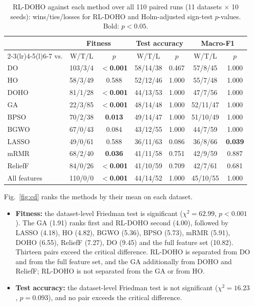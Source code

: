 \documentclass[journal]{IEEEtran}
\begin{document}
\begin{table}[t]
\centering
\caption{RL-DOHO against each method over all 110 paired runs (11 datasets $\times$ 10 seeds): wins/ties/losses for RL-DOHO and Holm-adjusted sign-test $p$-values. Bold: $p<0.05$.}
\label{tab:pooled}
\footnotesize
\setlength{\tabcolsep}{2.6pt}
\begin{tabular}{@{}lcccccc@{}}
\toprule
& \multicolumn{2}{c}{Fitness} & \multicolumn{2}{c}{Test accuracy} & \multicolumn{2}{c}{Macro-F1} \\
\cmidrule(lr){2-3}\cmidrule(lr){4-5}\cmidrule(l){6-7}
vs. & W/T/L & $p$ & W/T/L & $p$ & W/T/L & $p$ \\
\midrule
DO & 103/3/4 & \textbf{$<$0.001} & 58/14/38 & 0.467 & 57/8/45 & 1.000 \\
HO & 58/3/49 & 0.588 & 52/12/46 & 1.000 & 55/7/48 & 1.000 \\
DOHO & 81/1/28 & \textbf{$<$0.001} & 44/13/53 & 1.000 & 47/7/56 & 1.000 \\
\midrule
GA & 22/3/85 & \textbf{$<$0.001} & 48/14/48 & 1.000 & 52/11/47 & 1.000 \\
BPSO & 70/2/38 & \textbf{0.013} & 49/14/47 & 1.000 & 51/10/49 & 1.000 \\
BGWO & 67/0/43 & 0.084 & 43/12/55 & 1.000 & 44/7/59 & 1.000 \\
\midrule
LASSO & 49/0/61 & 0.588 & 36/11/63 & 0.086 & 36/8/66 & \textbf{0.039} \\
mRMR & 68/2/40 & \textbf{0.036} & 41/11/58 & 0.751 & 42/9/59 & 0.887 \\
ReliefF & 84/0/26 & \textbf{$<$0.001} & 41/10/59 & 0.709 & 42/7/61 & 0.681 \\
All features & 110/0/0 & \textbf{$<$0.001} & 44/14/52 & 1.000 & 45/10/55 & 1.000 \\
\bottomrule
\end{tabular}
\end{table}

Fig.~\ref{fig:cd} ranks the methods by their mean on each dataset.
\begin{itemize}
\item \textbf{Fitness:} the dataset-level Friedman test is significant ($\chi^2=62.99$, $p<0.001$). The GA (1.91) ranks first and RL-DOHO second (4.00), followed by LASSO (4.18), HO (4.82), BGWO (5.36), BPSO (5.73), mRMR (5.91), DOHO (6.55), ReliefF (7.27), DO (9.45) and the full feature set (10.82). Thirteen pairs exceed the critical difference. RL-DOHO is separated from DO and from the full feature set, and the GA additionally from DOHO and ReliefF; RL-DOHO is not separated from the GA or from HO.
\item \textbf{Test accuracy:} the dataset-level Friedman test is not significant ($\chi^2=16.23$, $p=0.093$), and no pair exceeds the critical difference.
\end{itemize}
\end{document}
